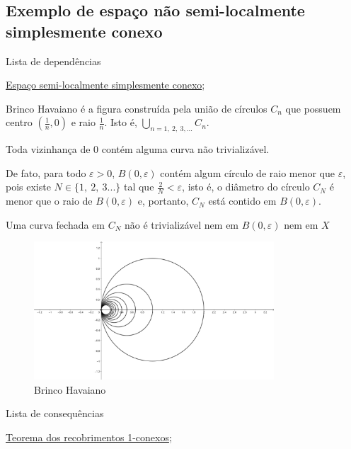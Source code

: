 \subsection{Exemplo de espaço não semi-localmente simplesmente conexo}
\label{não-semi-localmente-simplesmente-conexo-ex}
\begin{titlemize}{Lista de dependências}
	\item \hyperref[espaço-semi-localmente-simplesmente-conexo-def]{Espaço semi-localmente simplesmente conexo};\\ %
\end{titlemize}

\begin{ex}
    Brinco Havaiano é a figura construída pela união de círculos $C_n$ que possuem centro $(\frac{1}{n}, 0)$ e raio $\frac{1}{n}$. Isto é, $\underset{n=1,~2,~3,...}{\bigcup} C_n$.
\end{ex}


	Toda vizinhança de $0$ contém alguma curva não trivializável.

    De fato, para todo $\varepsilon>0$, $B(0,\varepsilon)$ contém algum círculo de raio menor que $\varepsilon$, pois existe $N\in \{1,~2,~3...\}$ tal que $\frac{2}{N}<\varepsilon$, isto é, o diâmetro do círculo $C_N$ é menor que o raio de $B(0,\varepsilon)$ e, portanto, $C_N$ está contido em $B(0,\varepsilon)$. 
    
    Uma curva fechada em $C_N$ não é trivializável nem em $B(0,\varepsilon)$ nem em $X$


\begin{figure}[h!]
    \centering
    \includegraphics[width=0.8\textwidth]{conteudo/fig-brinco-havaiano.png}
	\caption{Brinco Havaiano}
	\label{fig: brinco havaiano}
\end{figure}





\begin{titlemize}{Lista de consequências}
	\item \hyperref[recobrimento-1-conexo-prop]{Teorema dos recobrimentos 1-conexos};\\ %
\end{titlemize}